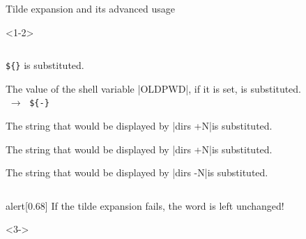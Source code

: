 \begin{frame}[fragile]{Tilde expansion and its advanced usage}
    \begin{overlayarea}{\textwidth}{0.6\textheight}
        \begin{onlyenv}<1-2>
            \vspace{-4mm}
            \begin{columns}
                \begin{column}{\dimexpr\paperwidth-10mm}
                    \begin{description}%
                        \setlength{\itemsep}{2mm}
                        \item[\texttt{\textasciitilde+}]
                            \texttt{\$\{\}} is substituted.
                        \item[\texttt{\textasciitilde-}]
                            The value of the shell variable \bash|OLDPWD|, if it is set, is substituted.\\
                            $\;\to\;$ \texttt{\$\{-\}}
                        \item[\texttt{\textasciitilde N}]
                            The string that would be displayed by \enspace\bash|dirs +N|\enspace is substituted.
                        \item[\texttt{\textasciitilde+N}]
                            The string that would be displayed by \enspace\bash|dirs +N|\enspace is substituted.
                        \item[\texttt{\textasciitilde-N}]
                            The string that would be displayed by \enspace\bash|dirs -N|\enspace is substituted.
                    \end{description}
                \end{column}
            \end{columns}
            \vspace{2mm}
            \begin{varblock}{alert}[0.68\textwidth]{}
                \large\alert{If the tilde expansion fails, the word is left unchanged!}
            \end{varblock}
        \end{onlyenv}
        \begin{onlyenv}<3->
            \begin{lstlisting}[style=MyBash, aboveskip=3mm]

\end{lstlisting}
\end{onlyenv}
\end{overlayarea}
\end{frame}
